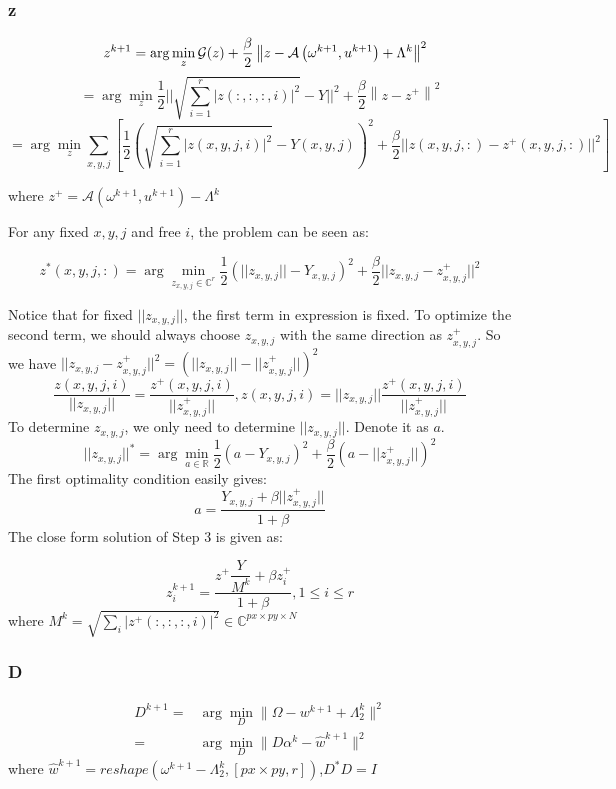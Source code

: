 \documentclass{article}
\numberwithin{equation}{section}
\begin{document}
 \subsubsection{z}
 $$
  \quad z^{k+1}=\arg \min _{z} \mathcal{G}(z)+\frac{\beta}{2}\left\|z-\mathcal{A}\left(\omega^{k+1}, u^{k+1}\right)+\Lambda^{k}\right\|^{2}\\
  $$
  $$
  =\arg \min _{z} \frac{1}{2}|| \sqrt{ \sum_{i=1}^{r} |z(:,:,:,i)|^2} - Y||^2+\frac{\beta}{2}\left\|z - z^+\right\|^{2}
 $$
 $$
 = \arg \min _{z} \sum_{x,y,j} [\frac{1}{2} ( \sqrt{ \sum_{i=1}^{r} |z(x,y,j,i)|^2} - Y(x,y,j) )^2 +
  \frac{\beta}{2}||z(x,y,j,:) - z^+(x,y,j,:)||^2 ]
 $$
 
 where $z^+ = \mathcal{A}\left(\omega^{k+1}, u^{k+1}\right) - \Lambda^{k}$
 
 For any fixed $x,y,j$ and free $i$, the problem can be seen as:
 
 $$
 z^*(x,y,j,:) = \arg \min_{z_{x,y,j} \in \mathbb{C}^{r}} \frac{1}{2} ( ||z_{x,y,j}|| - Y_{x,y,j} )^2
 + \frac{\beta}{2} ||z_{x,y,j} - z_{x,y,j}^+||^2
 $$
 
 Notice that for fixed $||z_{x,y,j}||$, the first term in expression is fixed. To optimize the second term, we should always choose $z_{x,y,j}$ with the same direction as $z_{x,y,j}^+$. So we have  $||z_{x,y,j} - z_{x,y,j}^+||^2 = (||z_{x,y,j}|| - ||z_{x,y,j}^+||)^2$
 $$
  \dfrac{z(x,y,j,i)}{||z_{x,y,j}||} = \dfrac{z^+(x,y,j,i)}{||z_{x,y,j}^+||}, z(x,y,j,i) = ||z_{x,y,j}||\dfrac{z^+(x,y,j,i)}{||z_{x,y,j}^+||}
 $$
 To determine $z_{x,y,j}$, we only need to determine $||z_{x,y,j}||$. Denote it as $a$.
 $$
 ||z_{x,y,j}||^* = \arg \min_{a \in \mathbb{R}} \frac{1}{2}(a - Y_{x,y,j})^2 + \dfrac{\beta}{2}
 (a - ||z_{x,y,j}^+||)^2
 $$
 The first optimality condition easily gives:
 $$
 a = \dfrac{Y_{x,y,j} + \beta ||z_{x,y,j}^+||}{1 + \beta}
 $$
 The  close form solution of Step 3 is given as:
 
 \begin{equation}
 z_i^{k+1} = \dfrac{z^+ \dfrac{Y}{ M^k} + \beta z_i^+}{1+\beta}, 1 \leq i \leq r
 \label{zup}
 \end{equation}
 where $M^k =\sqrt{\sum_i |z^+(:,:,:,i)|^2} \in \mathbb{C}^{px \times py \times N}$
 
\subsubsection{D}

$$
\begin{aligned}
D^{k+1} =& \arg \min_{D} \| \Omega -  w^{k+1} + \Lambda_2^{k}\|^{2} \\
=& \arg \min_{D} \| D\alpha^k - \hat {w}^{k+1}\|^{2} 
\end{aligned}
$$
where $\hat {w}^{k+1} = reshape( \omega^{k+1} - \Lambda_2^{k},[px\times py,r])$,$D^*D=I$
\end{document}
